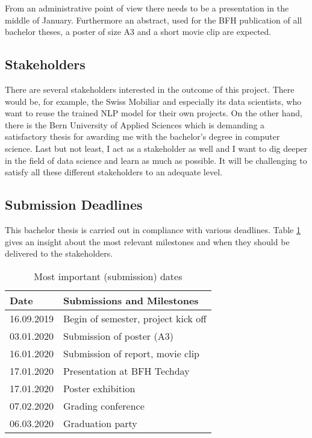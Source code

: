 From an administrative point of view there needs to be a presentation in the middle of January. Furthermore an abstract, used
for the BFH publication of all bachelor theses, a poster of size A3 and a short movie clip are expected.

\subsection{Stakeholders}

There are several stakeholders interested in the outcome of this project. There would be, for example, the Swiss Mobiliar and
especially its data scientists, who want to reuse the trained NLP model for their own projects. On the other hand, there is
the Bern University of Applied Sciences which is demanding a satisfactory thesis for awarding me with the bachelor's degree
in computer science. Last but not least, I act as a stakeholder as well and I want to dig deeper in the field of data science and
learn as much as possible. It will be challenging to satisfy all these different stakeholders to an adequate level.

\subsection{Submission Deadlines}

This bachelor thesis is carried out in compliance with various deadlines. Table \ref{tbl:deadlines} gives an insight about the most
relevant milestones and when they should be delivered to the stakeholders.

\begin{table}[h!]
    \centering
    \begin{tabular}{|l|l|}
        \hline
        \textbf{Date} & \textbf{Submissions and Milestones} \\ [0.5ex]
        \hline
        16.09.2019 & Begin of semester, project kick off \\
        03.01.2020 & Submission of poster (A3) \\
        16.01.2020 & Submission of report, movie clip \\
        17.01.2020 & Presentation at BFH Techday \\
        17.01.2020 & Poster exhibition \\
        07.02.2020 & Grading conference \\
        06.03.2020 & Graduation party \\ [1ex]
        \hline
    \end{tabular}
    \caption{Most important (submission) dates}
    \label{tbl:deadlines}
\end{table}


